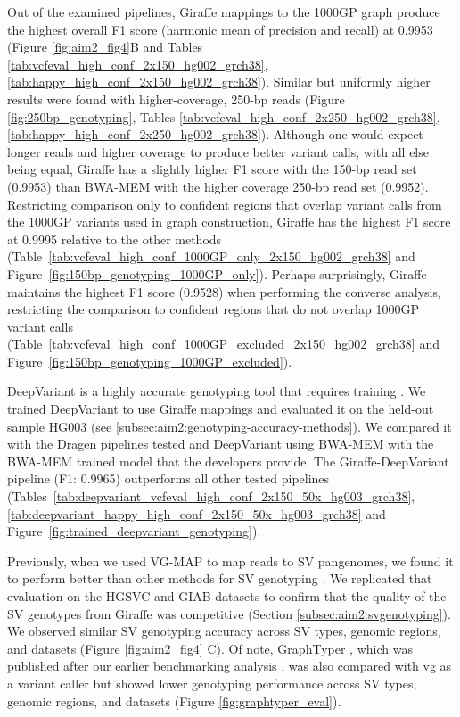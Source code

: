 \documentclass[11pt]{ucscthesis}
\begin{document}
Out of the examined pipelines, Giraffe mappings to the 1000GP graph produce the highest overall F1 score (harmonic mean of precision and recall) at 0.9953 (Figure \ref{fig:aim2_fig4}B and Tables \ref{tab:vcfeval_high_conf_2x150_hg002_grch38}, \ref{tab:happy_high_conf_2x150_hg002_grch38}).
Similar but uniformly higher results were found with higher-coverage, 250-bp reads (Figure \ref{fig:250bp_genotyping}, Tables \ref{tab:vcfeval_high_conf_2x250_hg002_grch38}, \ref{tab:happy_high_conf_2x250_hg002_grch38}).
Although one would expect longer reads and higher coverage to produce better variant calls, with all else being equal, Giraffe has a slightly higher F1 score with the 150-bp read set (0.9953) than BWA-MEM with the higher coverage 250-bp read set (0.9952).
Restricting comparison only to confident regions that overlap variant calls from the 1000GP variants used in graph construction, Giraffe has the highest F1 score at 0.9995 relative to the other methods (Table~\ref*{tab:vcfeval_high_conf_1000GP_only_2x150_hg002_grch38} and Figure~\ref*{fig:150bp_genotyping_1000GP_only}).
Perhaps surprisingly, Giraffe maintains the highest F1 score (0.9528) when performing the converse analysis, restricting the comparison to confident regions that do not overlap 1000GP variant calls (Table~\ref*{tab:vcfeval_high_conf_1000GP_excluded_2x150_hg002_grch38} and Figure~\ref*{fig:150bp_genotyping_1000GP_excluded}).

DeepVariant is a highly accurate genotyping tool that requires training \cite{deep_variant_2018}.
We trained DeepVariant to use Giraffe mappings and evaluated it on the held-out sample HG003 (see \ref{subsec:aim2:genotyping-accuracy-methods}).
We compared it with the Dragen pipelines tested and DeepVariant using BWA-MEM with the BWA-MEM trained model that the developers provide.
The Giraffe-DeepVariant pipeline (F1: 0.9965) outperforms all other tested pipelines (Tables~\ref*{tab:deepvariant_vcfeval_high_conf_2x150_50x_hg003_grch38}, \ref*{tab:deepvariant_happy_high_conf_2x150_50x_hg003_grch38} and Figure~\ref*{fig:trained_deepvariant_genotyping}).

Previously, when we used VG-MAP to map reads to SV pangenomes, we found it to perform better than other methods for SV genotyping \cite{hickey_vgsv_2020}.
We replicated that evaluation on the HGSVC and GIAB datasets \cite{zook_robust_2020,chaisson_sv_2019} to confirm that the quality of the SV genotypes from Giraffe was competitive (Section \ref{subsec:aim2:svgenotyping}).
We observed similar SV genotyping accuracy across SV types, genomic regions, and datasets (Figure \ref{fig:aim2_fig4} C). Of note, GraphTyper \cite{eggertsson2019}, which was published after our earlier benchmarking analysis \cite{hickey_vgsv_2020}, was also compared with vg as a variant caller but showed lower genotyping performance across SV types, genomic regions, and datasets  (Figure \ref{fig:graphtyper_eval}).
\end{document}
